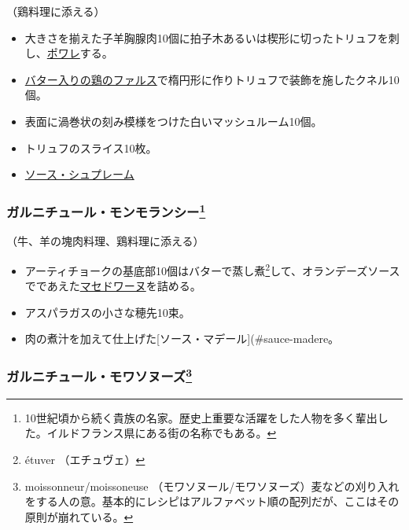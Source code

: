 \begin{recette}
（鶏料理に添える）

\begin{itemize}
\item
  大きさを揃えた子羊胸腺肉10個に拍子木あるいは楔形に切ったトリュフを刺し、\protect\hyperlink{les-poeles}{ポワレ}する。
\item
  \protect\hyperlink{farce-b}{バター入りの鶏のファルス}で楕円形に作りトリュフで装飾を施したクネル10個。
\item
  表面に渦巻状の刻み模様をつけた白いマッシュルーム10個。
\item
  トリュフのスライス10枚。
\item
  \protect\hyperlink{sauce-supreme}{ソース・シュプレーム}
\end{itemize}

\hypertarget{garniture-a-la-montmorency}{%
\subsubsection[ガルニチュール・モンモランシー]{\texorpdfstring{ガルニチュール・モンモランシー\footnote{10世紀頃から続く貴族の名家。歴史上重要な活躍をした人物を多く輩出した。イルドフランス県にある街の名称でもある。}}{ガルニチュール・モンモランシー}}\label{garniture-a-la-montmorency}}



（牛、羊の塊肉料理、鶏料理に添える）

\begin{itemize}
\item
  アーティチョークの基底部10個はバターで蒸し煮\footnote{étuver
    （エチュヴェ）}して、オランデーズソースでであえた\protect\hyperlink{garniture-macedoine}{マセドワーヌ}を詰める。
\item
  アスパラガスの小さな穂先10束。
\item
  肉の煮汁を加えて仕上げた{[}ソース・マデール{]}(\#sauce-madere。
\end{itemize}

\hypertarget{garniture-a-la-moissonneuse}{%
\subsubsection[ガルニチュール・モワソヌーズ]{\texorpdfstring{ガルニチュール・モワソヌーズ\footnote{moissonneur/moissoneuse
  （モワソヌール/モワソヌーズ）麦などの刈り入れをする人の意。基本的にレシピはアルファベット順の配列だが、ここはその原則が崩れている。}}{ガルニチュール・モワソヌーズ}}\label{garniture-a-la-moissonneuse}}


\end{recette}
